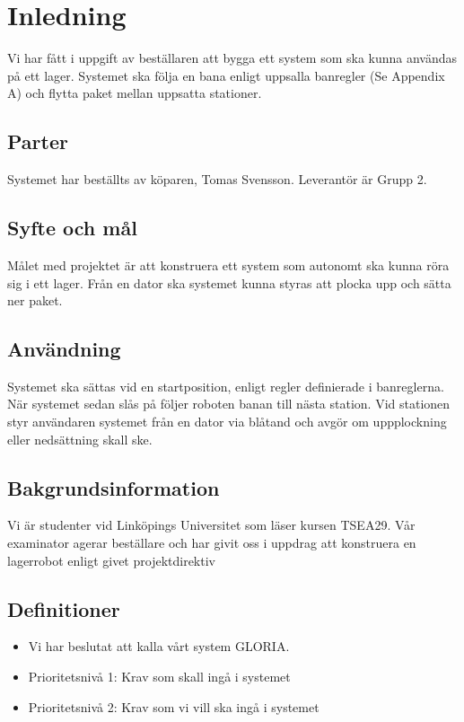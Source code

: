 \section{Inledning}
Vi har fått i uppgift av beställaren att bygga ett system som ska kunna användas på ett lager. Systemet ska följa en bana enligt uppsalla banregler (Se Appendix A) och flytta paket mellan uppsatta stationer.

\begin{LIPSkravlista}
\end{LIPSkravlista}

\subsection{Parter}
Systemet har beställts av köparen, Tomas Svensson. Leverantör är Grupp 2.

\subsection{Syfte och mål}
Målet med projektet är att konstruera ett system som autonomt ska kunna röra sig i ett lager. Från en dator ska systemet kunna styras att plocka upp och sätta ner paket.

\subsection{Användning}
Systemet ska sättas vid en startposition, enligt regler definierade i banreglerna. När systemet sedan slås på följer roboten banan till nästa station. Vid stationen styr användaren systemet från en dator via blåtand och avgör om uppplockning eller nedsättning skall ske.

\subsection{Bakgrundsinformation}
Vi är studenter vid Linköpings Universitet som läser kursen TSEA29. Vår examinator agerar beställare och har givit oss i uppdrag att konstruera en lagerrobot enligt givet projektdirektiv

\subsection{Definitioner}

\begin{itemize}
\item{Vi har beslutat att kalla vårt system GLORIA.}
\item{Prioritetsnivå 1: Krav som skall ingå i systemet}
\item{Prioritetsnivå 2: Krav som vi vill ska ingå i systemet}
\end{itemize}